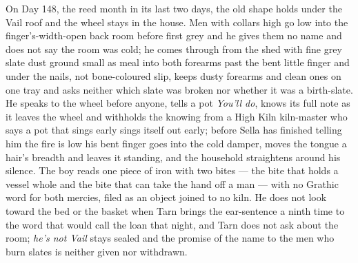 \documentclass{design/chronicle}
\begin{document}
{On Day 148, the reed month in its last two days, the old shape holds under the Vail roof and the wheel stays in the house. Men with collars high go low into the finger’s-width-open back room before first grey and he gives them no name and does not say the room was cold; he comes through from the shed with fine grey slate dust ground small as meal into both forearms past the bent little finger and under the nails, not bone-coloured slip, keeps dusty forearms and clean ones on one tray and asks neither which slate was broken nor whether it was a birth-slate. He speaks to the wheel before anyone, tells a pot \emph{You’ll do}, knows its full note as it leaves the wheel and withholds the knowing from a High Kiln kiln-master who says a pot that sings early sings itself out early; before Sella has finished telling him the fire is low his bent finger goes into the cold damper, moves the tongue a hair’s breadth and leaves it standing, and the household straightens around his silence. The boy reads one piece of iron with two bites --- the bite that holds a vessel whole and the bite that can take the hand off a man --- with no Grathic word for both mercies, filed as an object joined to no kiln. He does not look toward the bed or the basket when Tarn brings the ear-sentence a ninth time to the word that would call the loan that night, and Tarn does not ask about the room; \emph{he’s not Vail} stays sealed and the promise of the name to the men who burn slates is neither given nor withdrawn.

}
\end{document}
